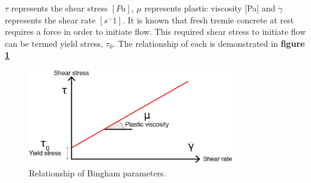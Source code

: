 \noindent
$\tau$ represents the shear stress $[Pa]$, $\mu$ represents plastic viscosity [Pa] and $\dot{\gamma}$ represents the shear rate $[s^-1]$. It is known that fresh tremie concrete at rest requires a force in order to initiate flow. This required shear stress to initiate flow can be termed yield stress, $\tau_0$. The relationship of each is demonstrated in {\bfseries figure \ref{fig:bingham}}
\begin{figure}[H]
\centering
\includegraphics[width=0.8\textwidth]{bingham.png}
\caption{\label{fig:bingham} Relationship of Bingham parameters.}
\end{figure}


